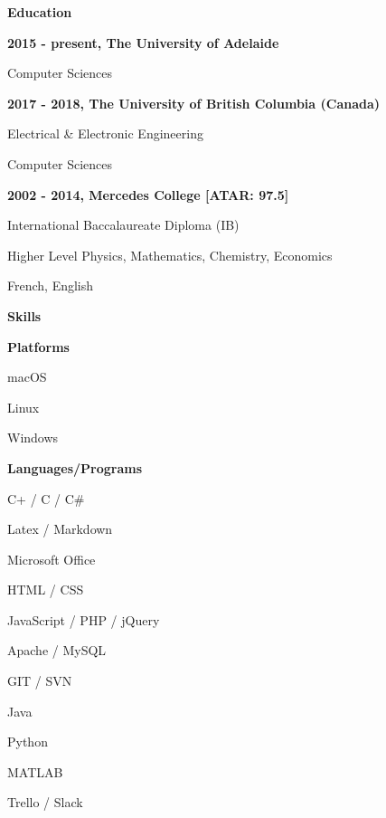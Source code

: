 \documentclass[a4paper,12pt,final]{memoir}
\newcommand{\CVSection}[1]
	{\Large\textbf{#1}\par
	\vspace{0.5em}\normalsize\normalfont}
\newcommand{\CVItem}[1]
	{\textbf{\color{Maroon} #1}}
\begin{document}
\CVSection{Education}
\CVItem{2015 - present, The University of Adelaide}\\
\begin{compactitem}[\color{Maroon}$\circ$]	
	\item Computer Sciences
\end{compactitem}
\vspace{1em}

\CVItem{2017 - 2018, The University of British Columbia (Canada)}\\
\begin{compactitem}[\color{Maroon}$\circ$]	
	\item Electrical \& Electronic Engineering
	\item Computer Sciences
\end{compactitem}
\vspace{1em}

\CVItem{2002 - 2014, Mercedes College [ATAR: 97.5]}\\
\begin{compactitem}[\color{Maroon}$\circ$]
	\item International Baccalaureate Diploma (IB)
	\item Higher Level Physics, Mathematics, Chemistry, Economics
	\item French, English
\end{compactitem}
\vspace{1.5em}

\clearpage
\framebreak
\framebreak

\CVSection{Skills}
\CVItem{Platforms}
\begin{multicols}{3}
\begin{compactitem}[\color{Maroon}$\circ$]
	\item macOS 
	\item Linux
	\item Windows 
\end{compactitem}
\end{multicols}
\vspace{1em}

\CVItem{Languages/Programs}
\begin{multicols}{3}
\begin{compactitem}[\color{Maroon}$\circ$]
	\item C+ / C / C\# 
	\item Latex / Markdown
	\item Microsoft Office
	\item HTML / CSS
	\item JavaScript / PHP / jQuery
	\item Apache / MySQL
	\item GIT / SVN
	\item Java
	\item Python
	\item MATLAB
	\item Trello / Slack
\end{compactitem}
\end{multicols}
\vspace{1.5em}
\end{document}
